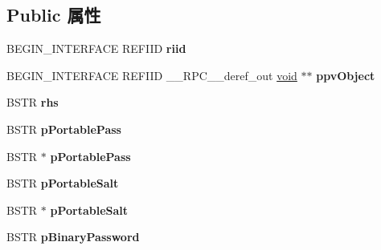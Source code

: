 \subsection*{Public 属性}
\begin{DoxyCompactItemize}
\item 
\mbox{\label{struct_i_ms_rdp_client_non_scriptable2_vtbl_ae3bbbe948aa55b368285f0d9f6303f3a}} 
B\+E\+G\+I\+N\+\_\+\+I\+N\+T\+E\+R\+F\+A\+CE R\+E\+F\+I\+ID {\bfseries riid}
\item 
\mbox{\label{struct_i_ms_rdp_client_non_scriptable2_vtbl_a308b727fb363834b7badff09be331dcf}} 
B\+E\+G\+I\+N\+\_\+\+I\+N\+T\+E\+R\+F\+A\+CE R\+E\+F\+I\+ID \+\_\+\+\_\+\+R\+P\+C\+\_\+\+\_\+deref\+\_\+out \hyperlink{interfacevoid}{void} $\ast$$\ast$ {\bfseries ppv\+Object}
\item 
\mbox{\label{struct_i_ms_rdp_client_non_scriptable2_vtbl_a518b65e6453efdce333f4613cf22b996}} 
B\+S\+TR {\bfseries rhs}
\item 
\mbox{\label{struct_i_ms_rdp_client_non_scriptable2_vtbl_a28f5a1b935b51c3b4ad3c7fe5ec7738a}} 
B\+S\+TR {\bfseries p\+Portable\+Pass}
\item 
\mbox{\label{struct_i_ms_rdp_client_non_scriptable2_vtbl_a1a076e32e0427b83f846479260e74fa3}} 
B\+S\+TR $\ast$ {\bfseries p\+Portable\+Pass}
\item 
\mbox{\label{struct_i_ms_rdp_client_non_scriptable2_vtbl_a9f563540ca65b7db27025547e664264d}} 
B\+S\+TR {\bfseries p\+Portable\+Salt}
\item 
\mbox{\label{struct_i_ms_rdp_client_non_scriptable2_vtbl_a3f088c521586e65d9428c70c7bfbcca2}} 
B\+S\+TR $\ast$ {\bfseries p\+Portable\+Salt}
\item 
\mbox{\label{struct_i_ms_rdp_client_non_scriptable2_vtbl_a7f4a4d22372eac047c385c22e04d2abd}} 
B\+S\+TR {\bfseries p\+Binary\+Password}
\item 
$$
\end{DoxyCompactItemize}
